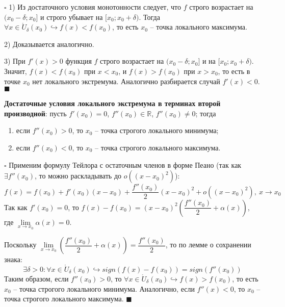 \documentclass[12pt, a4paper, reqno]{article}
\begin{document}
    $\square$ 1) Из достаточного условия монотонности следует, что $f$ строго возрастает на
    $(x_0 - \delta; x_0]$ и строго убывает на $[x_0; x_0 + \delta)$. Тогда
    $\forall x\in\mathring U_{\delta}(x_0)\hookrightarrow f(x) < f(x_0)$, то есть $x_0$ -- точка
    локального максимума.

    2) Доказывается аналогично.

    3) При $f'(x) > 0$ функция $f$ строго возрастает на $(x_0 - \delta; x_0]$ и на
    $[x_0; x_0 + \delta)$. Значит, $f(x) < f(x_0)$ при $x < x_0$, и $f(x) > f(x_0)$ при $x > x_0$,
    то есть в точке $x_0$ нет локального экстремума. Аналогично разбирается случай $f'(x) < 0$.
    $\blacksquare$

    \textbf{Достаточные условия локального экстремума в терминах второй производной}: пусть
    $f'(x_0) = 0$, $f''(x_0)\in\mathbb{R}$, $f''(x_0)\neq 0$; тогда
    \begin{enumerate}
        \item если $f''(x_0) > 0$, то $x_0$ -- точка строгого локального минимума;
        \item если $f''(x_0) < 0$, то $x_0$ -- точка строгого локального максимума.
    \end{enumerate}

    $\square$ Применим формулу Тейлора с остаточным членов в форме Пеано (так как $\exists f''(x_0)$,
    то можно раскладывать до $o\left((x - x_0)^2\right)$):
    \begin{equation*}
        f(x) = f(x_0) + f'(x_0)(x - x_0) + \dfrac{f''(x_0)}{2}(x - x_0)^2 + o\left((x - x_0)^2\right),\
        x \to x_0
    \end{equation*}
    Так как $f'(x_0) = 0$, то $f(x) - f(x_0) = (x - x_0)^2\left(\dfrac{f''(x_0)}{2} + \alpha(x)\right)$,
    где $\lim\limits_{x\to x_0} \alpha(x) = 0$.

    Поскольку $\lim\limits_{x\to x_0} \left(\dfrac{f''(x_0)}{2} + \alpha(x)\right) =
    \dfrac{f''(x_0)}{2}$, то по лемме о сохранении знака:
    \begin{equation*}
        \exists\delta > 0: \forall x\in\mathring U_{\delta}(x_0)\hookrightarrow
        sign(f(x) - f(x_0)) = sign(f''(x_0))
    \end{equation*}
    Таким образом, если $f''(x_0) > 0$, то $\forall x\in\mathring U_{\delta}(x_0)\hookrightarrow
    f(x) > f(x_0)$, то есть $x_0$ -- точка строгого локального минимума. Аналогично, если
    $f''(x) < 0$, то $x_0$ -- точка строгого локального максимума. $\blacksquare$
\end{document}
